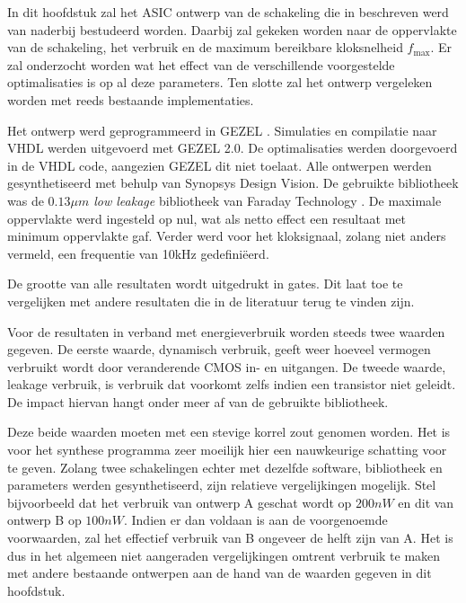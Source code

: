 
In dit hoofdstuk zal het ASIC ontwerp van de schakeling die in  beschreven werd van naderbij bestudeerd worden. Daarbij zal gekeken worden naar de oppervlakte van de schakeling, het verbruik en de maximum bereikbare kloksnelheid $f_{\text{max}}$. Er zal onderzocht worden wat het effect van de verschillende voorgestelde optimalisaties is op al deze parameters. Ten slotte zal het ontwerp vergeleken worden met reeds bestaande implementaties.

Het ontwerp werd geprogrammeerd in GEZEL \cite{gezel}. Simulaties en compilatie naar VHDL werden uitgevoerd met GEZEL 2.0. De optimalisaties werden doorgevoerd in de VHDL code, aangezien GEZEL dit niet toelaat. Alle ontwerpen werden gesynthetiseerd met behulp van Synopsys Design Vision. De gebruikte bibliotheek was de \emph{$0.13 \mu m$ low leakage} bibliotheek van Faraday Technology \cite{cell-databook}. De maximale oppervlakte werd ingesteld op nul, wat als netto effect een resultaat met minimum oppervlakte gaf. Verder werd voor het kloksignaal, zolang niet anders vermeld, een frequentie van 10kHz gedefini\"eerd.

De grootte van alle resultaten wordt uitgedrukt in gates. Dit laat toe te vergelijken met andere resultaten die in de literatuur terug te vinden zijn.

Voor de resultaten in verband met energieverbruik worden steeds twee waarden gegeven. De eerste waarde, dynamisch verbruik, geeft weer hoeveel vermogen verbruikt wordt door veranderende CMOS in- en uitgangen. De tweede waarde, leakage verbruik, is verbruik dat voorkomt zelfs indien een transistor niet geleidt. De impact hiervan hangt onder meer af van de gebruikte bibliotheek.

Deze beide waarden moeten met een stevige korrel zout genomen worden. Het is voor het synthese programma zeer moeilijk hier een nauwkeurige schatting voor te geven. Zolang twee schakelingen echter met dezelfde software, bibliotheek en parameters werden gesynthetiseerd, zijn relatieve vergelijkingen mogelijk. Stel bijvoorbeeld dat het verbruik van ontwerp A geschat wordt op $200 nW$ en dit van ontwerp B op $100 nW$. Indien er dan voldaan is aan de voorgenoemde voorwaarden, zal het effectief verbruik van B ongeveer de helft zijn van A. Het is dus in het algemeen niet aangeraden vergelijkingen omtrent verbruik te maken met andere bestaande ontwerpen aan de hand van de waarden gegeven in dit hoofdstuk.

